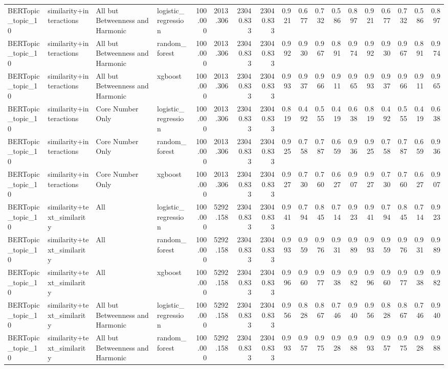 \begin{tabular}{llllrrrrrrrrrrrrrr}
BERTopic_topic_10 & similarity+interactions & All but Betweenness and Harmonic & logistic_regression & 100.000 & 2013.306 & 23040.833 & 23040.833 & 0.921 & 0.677 & 0.732 & 0.586 & 0.897 & 0.921 & 0.677 & 0.732 & 0.586 & 0.897 \\
BERTopic_topic_10 & similarity+interactions & All but Betweenness and Harmonic & random_forest & 100.000 & 2013.306 & 23040.833 & 23040.833 & 0.992 & 0.930 & 0.967 & 0.891 & 0.974 & 0.992 & 0.930 & 0.967 & 0.891 & 0.974 \\
BERTopic_topic_10 & similarity+interactions & All but Betweenness and Harmonic & xgboost & 100.000 & 2013.306 & 23040.833 & 23040.833 & 0.993 & 0.937 & 0.966 & 0.911 & 0.965 & 0.993 & 0.937 & 0.966 & 0.911 & 0.965 \\
BERTopic_topic_10 & similarity+interactions & Core Number Only & logistic_regression & 100.000 & 2013.306 & 23040.833 & 23040.833 & 0.819 & 0.492 & 0.555 & 0.419 & 0.638 & 0.819 & 0.492 & 0.555 & 0.419 & 0.638 \\
BERTopic_topic_10 & similarity+interactions & Core Number Only & random_forest & 100.000 & 2013.306 & 23040.833 & 23040.833 & 0.925 & 0.758 & 0.787 & 0.659 & 0.936 & 0.925 & 0.758 & 0.787 & 0.659 & 0.936 \\
BERTopic_topic_10 & similarity+interactions & Core Number Only & xgboost & 100.000 & 2013.306 & 23040.833 & 23040.833 & 0.927 & 0.730 & 0.760 & 0.627 & 0.907 & 0.927 & 0.730 & 0.760 & 0.627 & 0.907 \\
BERTopic_topic_10 & similarity+text_similarity & All & logistic_regression & 100.000 & 5292.158 & 23040.833 & 23040.833 & 0.941 & 0.794 & 0.845 & 0.714 & 0.923 & 0.941 & 0.794 & 0.845 & 0.714 & 0.923 \\
BERTopic_topic_10 & similarity+text_similarity & All & random_forest & 100.000 & 5292.158 & 23040.833 & 23040.833 & 0.993 & 0.959 & 0.976 & 0.931 & 0.989 & 0.993 & 0.959 & 0.976 & 0.931 & 0.989 \\
BERTopic_topic_10 & similarity+text_similarity & All & xgboost & 100.000 & 5292.158 & 23040.833 & 23040.833 & 0.996 & 0.960 & 0.977 & 0.938 & 0.982 & 0.996 & 0.960 & 0.977 & 0.938 & 0.982 \\
BERTopic_topic_10 & similarity+text_similarity & All but Betweenness and Harmonic & logistic_regression & 100.000 & 5292.158 & 23040.833 & 23040.833 & 0.956 & 0.828 & 0.867 & 0.746 & 0.940 & 0.956 & 0.828 & 0.867 & 0.746 & 0.940 \\
BERTopic_topic_10 & similarity+text_similarity & All but Betweenness and Harmonic & random_forest & 100.000 & 5292.158 & 23040.833 & 23040.833 & 0.993 & 0.957 & 0.975 & 0.928 & 0.988 & 0.993 & 0.957 & 0.975 & 0.928 & 0.988 \\

\end{tabular}
